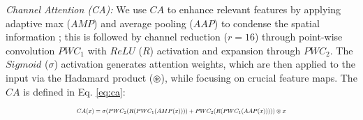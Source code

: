 \noindent \textit{Channel Attention (CA):} 
We use $CA$ \cite{hu2018squeeze} to enhance relevant features by applying adaptive max ($AMP$) and average pooling ($AAP$) to condense the spatial information \cite{Rahman_2023_WACV}; this is followed by channel reduction ($r = 16$) through point-wise convolution $PWC_1$ with $ReLU$ ($R$) activation \cite{nair2010rectified} and expansion through $PWC_2$. The $Sigmoid$ ($\sigma$) activation generates attention weights, which are then applied to the input via the Hadamard product ($\circledast$), while focusing on crucial feature maps. The $CA$ is defined in Eq. \ref{eq:ca}:%
 \begin{equation}
 \scalebox{0.62}{\( CA(x)=\sigma(PWC_2(R(PWC_1(AMP(x))))+PWC_2(R(PWC_1(AAP(x))))) \circledast x
 \)}
    \label{eq:ca}
\end{equation}

